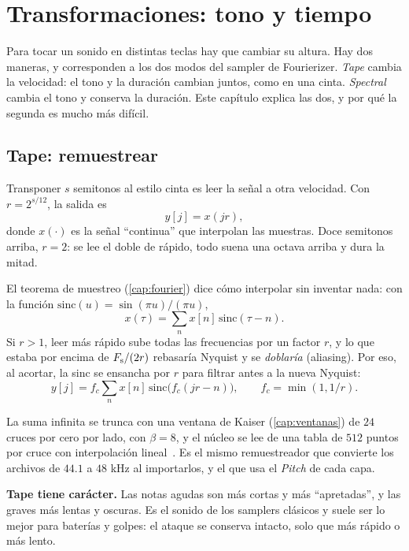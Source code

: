 \chapter{Transformaciones: tono y tiempo}\label{cap:transformaciones}

Para tocar un sonido en distintas teclas hay que cambiar su altura. Hay dos maneras, y
corresponden a los dos modos del sampler de Fourierizer. \emph{Tape} cambia la velocidad: el tono y
la duración cambian juntos, como en una cinta. \emph{Spectral} cambia el tono y conserva la
duración. Este capítulo explica las dos, y por qué la segunda es mucho más difícil.

\section{Tape: remuestrear}

Transponer $s$ semitonos al estilo cinta es leer la señal a otra velocidad. Con
$r=2^{s/12}$, la salida es
\[
  y[j]=x(jr),
\]
donde $x(\cdot)$ es la señal ``continua'' que interpolan las muestras. Doce semitonos arriba,
$r=2$: se lee el doble de rápido, todo suena una octava arriba y dura la mitad.

El teorema de muestreo (\cref{cap:fourier}) dice cómo interpolar sin inventar nada: con la función
$\mathrm{sinc}(u)=\sin(\pi u)/(\pi u)$,
\[
  x(\tau)=\sum_{n}x[n]\,\mathrm{sinc}(\tau-n).
\]
Si $r>1$, leer más rápido sube todas las frecuencias por un factor $r$, y lo que estaba por encima
de $F_{\mathrm{s}}/(2r)$ rebasaría Nyquist y se \emph{doblaría} (aliasing). Por eso, al acortar, la sinc se
ensancha por $r$ para filtrar antes a la nueva Nyquist:
\[
  y[j]=f_c\sum_n x[n]\,\mathrm{sinc}\bigl(f_c(jr-n)\bigr),\qquad f_c=\min(1,1/r).
\]

La suma infinita se trunca con una ventana de Kaiser (\cref{cap:ventanas}) de $24$ cruces por cero
por lado, con $\beta=8$, y el núcleo se lee de una tabla de $512$ puntos por cruce con interpolación
lineal~\cite{smith2011}. Es el mismo remuestreador que convierte los archivos de $44.1$ a $48$ kHz al
importarlos, y el que usa el \emph{Pitch} de cada capa.

\begin{estudio}
\textbf{Tape tiene carácter.} Las notas agudas son más cortas y más ``apretadas'', y las graves más
lentas y oscuras. Es el sonido de los samplers clásicos y suele ser lo mejor para baterías y
golpes: el ataque se conserva intacto, solo que más rápido o más lento.
\end{estudio}

